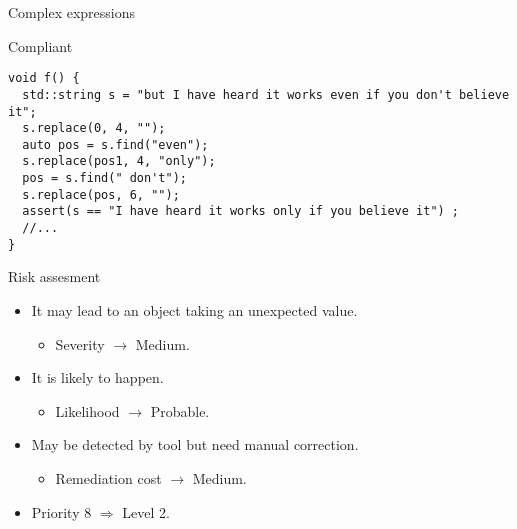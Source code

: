 \begin{frame}[t,fragile]{Complex expressions}
\begin{block}{Compliant}
\begin{lstlisting}
void f() {
  std::string s = "but I have heard it works even if you don't believe it";
  s.replace(0, 4, "");
  auto pos = s.find("even");
  s.replace(pos1, 4, "only");
  pos = s.find(" don't");
  s.replace(pos, 6, "");
  assert(s == "I have heard it works only if you believe it") ;
  //...
}
\end{lstlisting}
\end{block}
\end{frame}

\begin{frame}[t]{Risk assesment}
\begin{itemize}
  \item It may lead to an object taking an unexpected value.
    \begin{itemize}
      \item Severity $\rightarrow$ Medium.
    \end{itemize}

  \vfill
   \item It is likely to happen.
   \begin{itemize}
      \item Likelihood $\rightarrow$ Probable.
    \end{itemize}

  \vfill
  \item May be detected by tool but need manual correction.
    \begin{itemize}
      \item Remediation cost $\rightarrow$ Medium.
    \end{itemize}

  \vfill
  \item Priority 8 $\Rightarrow$ Level 2.
\end{itemize}
\end{frame}

